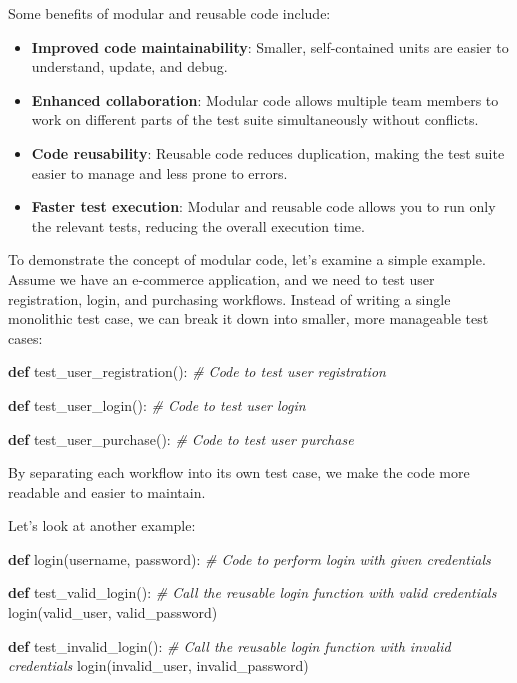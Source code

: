 \documentclass[
  paper=a4,
  ,captions=tableheading
]{scrartcl}
\newenvironment{Shaded}{}{}
\newcommand{\CommentTok}[1]{\textcolor[rgb]{0.38,0.63,0.69}{\textit{#1}}}
\newcommand{\KeywordTok}[1]{\textcolor[rgb]{0.00,0.44,0.13}{\textbf{#1}}}
\newcommand{\NormalTok}[1]{#1}
\newcommand{\StringTok}[1]{\textcolor[rgb]{0.25,0.44,0.63}{#1}}
\providecommand{\tightlist}{%
  \setlength{\itemsep}{0pt}\setlength{\parskip}{0pt}}
\begin{document}
Some benefits of modular and reusable code include:

\begin{itemize}
\tightlist
\item
  \textbf{Improved code maintainability}: Smaller, self-contained units
  are easier to understand, update, and debug.
\item
  \textbf{Enhanced collaboration}: Modular code allows multiple team
  members to work on different parts of the test suite simultaneously
  without conflicts.
\item
  \textbf{Code reusability}: Reusable code reduces duplication, making
  the test suite easier to manage and less prone to errors.
\item
  \textbf{Faster test execution}: Modular and reusable code allows you
  to run only the relevant tests, reducing the overall execution time.
\end{itemize}

To demonstrate the concept of modular code, let's examine a simple
example. Assume we have an e-commerce application, and we need to test
user registration, login, and purchasing workflows. Instead of writing a
single monolithic test case, we can break it down into smaller, more
manageable test cases:

\begin{Shaded}
\begin{Highlighting}[]

\KeywordTok{def}\NormalTok{ test\_user\_registration():}
    \CommentTok{\# Code to test user registration}

\KeywordTok{def}\NormalTok{ test\_user\_login():}
    \CommentTok{\# Code to test user login}

\KeywordTok{def}\NormalTok{ test\_user\_purchase():}
    \CommentTok{\# Code to test user purchase}
\end{Highlighting}
\end{Shaded}

By separating each workflow into its own test case, we make the code
more readable and easier to maintain.

Let's look at another example:

\begin{Shaded}
\begin{Highlighting}[]
\KeywordTok{def}\NormalTok{ login(username, password):}
    \CommentTok{\# Code to perform login with given credentials}

\KeywordTok{def}\NormalTok{ test\_valid\_login():}
    \CommentTok{\# Call the reusable login function with valid credentials}
\NormalTok{    login(}\StringTok{\textquotesingle{}valid\_user\textquotesingle{}}\NormalTok{, }\StringTok{\textquotesingle{}valid\_password\textquotesingle{}}\NormalTok{)}

\KeywordTok{def}\NormalTok{ test\_invalid\_login():}
    \CommentTok{\# Call the reusable login function with invalid credentials}
\NormalTok{    login(}\StringTok{\textquotesingle{}invalid\_user\textquotesingle{}}\NormalTok{, }\StringTok{\textquotesingle{}invalid\_password\textquotesingle{}}\NormalTok{)}
\end{Highlighting}
\end{Shaded}
\end{document}
